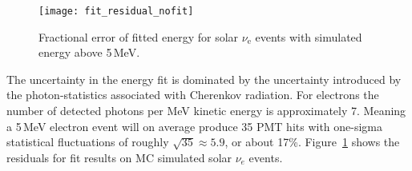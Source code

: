 \begin{figure}[htbp]
\centering
\texttt{[image: fit\_residual\_nofit]}
\caption[EnergyRSP Fit Residuals]{Fractional error of fitted energy   for solar $\nu_{\mathrm{e}}$ events
with simulated energy above 5\,MeV.
}
\label{fig:mc_fit_residuals}
\end{figure}
The uncertainty in the energy fit is dominated by the uncertainty
introduced by the photon-statistics associated with Cherenkov radiation.
For electrons the number of detected photons per MeV kinetic energy is approximately 7.
Meaning a 5\,MeV electron event will on average produce 35 PMT hits with
one-sigma statistical fluctuations of roughly $\sqrt{35} \approx 5.9$, or about 17\%.
Figure~\ref{fig:mc_fit_residuals} shows the residuals for fit results on MC simulated solar $\nu_{e}$ events.

